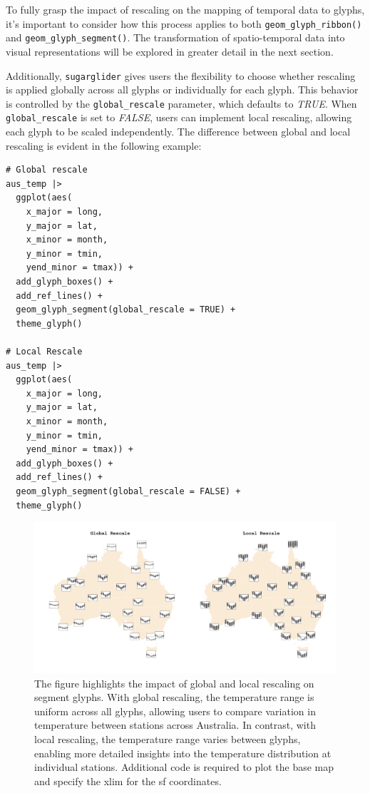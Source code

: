 To fully grasp the impact of rescaling on the mapping of temporal data to glyphs, it's important to consider how this process applies to both \texttt{geom\_glyph\_ribbon()} and \texttt{geom\_glyph\_segment()}. The transformation of spatio-temporal data into visual representations will be explored in greater detail in the next section.

Additionally, \texttt{sugarglider} gives users the flexibility to choose whether rescaling is applied globally across all glyphs or individually for each glyph. This behavior is controlled by the \texttt{global\_rescale} parameter, which defaults to \emph{TRUE}. When \texttt{global\_rescale} is set to \emph{FALSE}, users can implement local rescaling, allowing each glyph to be scaled independently. The difference between global and local rescaling is evident in the following example:

\begin{verbatim}
# Global rescale
aus_temp |>
  ggplot(aes(
    x_major = long, 
    y_major = lat, 
    x_minor = month, 
    y_minor = tmin, 
    yend_minor = tmax)) +
  add_glyph_boxes() +
  add_ref_lines() +
  geom_glyph_segment(global_rescale = TRUE) +
  theme_glyph()

# Local Rescale
aus_temp |>
  ggplot(aes(
    x_major = long, 
    y_major = lat, 
    x_minor = month, 
    y_minor = tmin, 
    yend_minor = tmax)) +
  add_glyph_boxes() +
  add_ref_lines() +
  geom_glyph_segment(global_rescale = FALSE) +
  theme_glyph()
\end{verbatim}

\begin{figure}
\includegraphics[width=50in]{figures/global_rescale} \caption{The figure highlights the impact of global and local rescaling on segment glyphs. With global rescaling, the temperature range is uniform across all glyphs, allowing users to compare variation in temperature between stations across Australia. In contrast, with local rescaling, the temperature range varies between glyphs, enabling more detailed insights into the temperature distribution at individual stations. Additional code is required to plot the base map and specify the xlim for the sf coordinates.}\label{fig:unnamed-chunk-6}
\end{figure}


